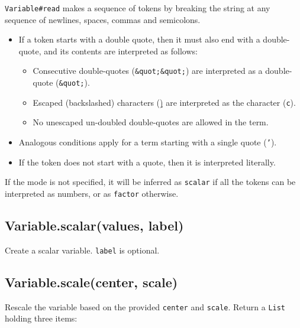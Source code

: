 \documentclass{article}
\begin{document}
\texttt{Variable\#read} makes a sequence of tokens by breaking the string at any sequence
of newlines, spaces, commas and semicolons.


\begin{itemize}

\item If a token starts with a double quote, then it must also end with a
double-quote, and its contents are interpreted as follows:\begin{itemize}

\item Consecutive double-quotes (\texttt{\&quot;\&quot;}) are interpreted as a double-quote (\texttt{\&quot;}).

\item Escaped (backslashed) characters (\texttt{\c}) are interpreted as the character (\texttt{c}).

\item No unescaped un-doubled double-quotes are allowed in the term.

\end{itemize}



\item Analogous conditions apply for a term starting with a single quote (\texttt{'}).

\item If the token does not start with a quote, then it is interpreted literally.

\end{itemize}

If the mode is not specified, it will be inferred as \texttt{scalar} if all the tokens
can be interpreted as numbers, or as \texttt{factor} otherwise.


    \subsection*{Variable.scalar(values, label)}
    Create a scalar variable. \texttt{label} is optional.


    \subsection*{Variable.scale(center, scale)}
    Rescale the variable based on the provided \texttt{center} and \texttt{scale}.
Return a \texttt{List} holding three items:
\end{document}
